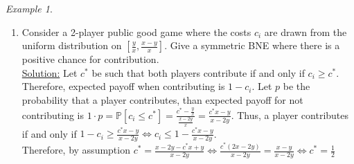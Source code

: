\documentclass[a4paper, 12pt]{article}
\theoremstyle{plain}
\theoremstyle{definition}
\theoremstyle{lemma}
\theoremstyle{remark}
\theoremstyle{corollary}
\theoremstyle{example}
\newtheorem{example}[theorem]{Example}
\begin{document}
\begin{example}
\begin{enumerate}
			\item Consider a 2-player public good game where the costs $c_i$ are drawn from the uniform distribution on $[\frac{y}{x}, \frac{x-y}{x}]$. Give a symmetric BNE where there is a positive chance for contribution.\\
			\underline{Solution:} Let $c^*$ be such that both players contribute if and only if $c_i\geq c^*$. Therefore, expected payoff when contributing is $1-c_i$. Let $p$ be the probability that a player contributes, than expected payoff for not contributing is $1\cdot p = \mathbb{P}[c_i \leq c^*] = \frac{c^*-\frac{y}{x}}{\frac{x-2y}{x}} = \frac{c^*x - y}{x-2y}$.
			Thus, a player contributes if and only if $1-c_i \geq \frac{c^*x - y}{x-2y} \Leftrightarrow c_i \leq 1- \frac{c^*x - y}{x-2y}$.\\
			Therefore, by assumption $c^* = \frac{x-2y-c^*x+y}{x-2y} \Leftrightarrow \frac{c^*(2x-2y)}{x-2y} = \frac{x-y}{x-2y} \Leftrightarrow c^* = \frac{1}{2}$
		\end{enumerate}
	\end{example}
\end{document}
